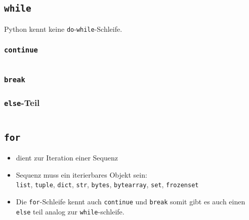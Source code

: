 \subsection{\texttt{while}}


\begin{achtung}
	Python kennt keine \texttt{do}-\texttt{while}-Schleife.
\end{achtung}

\begin{minipage}[t]{0.49\textwidth}
\subsubsection{\texttt{continue}}

\end{minipage}
\begin{minipage}[t]{0.02\textwidth} $ \quad $\end{minipage}
\begin{minipage}[t]{0.49\textwidth}
\subsubsection{\texttt{break}}

\end{minipage}

\begin{minipage}[t]{0.44\textwidth}
	\subsubsection{\texttt{else}-Teil}
	
\end{minipage}
\begin{minipage}[t]{0.02\textwidth} $ \quad $\end{minipage}
\begin{minipage}[t]{0.54\textwidth}
	\subsection{\texttt{for}}
	
	\begin{itemize}
		\item dient zur Iteration einer Sequenz
		\item Sequenz muss ein iterierbares Objekt sein:\\
		\texttt{list}, \texttt{tuple}, \texttt{dict}, \texttt{str}, \texttt{bytes}, \texttt{bytearray}, \texttt{set}, \texttt{frozenset}
		\item Die \texttt{for}-Schleife kennt auch \texttt{continue} und \texttt{break} somit gibt es auch einen \texttt{else} teil analog zur \texttt{while}-schleife.
	\end{itemize}
\end{minipage}





